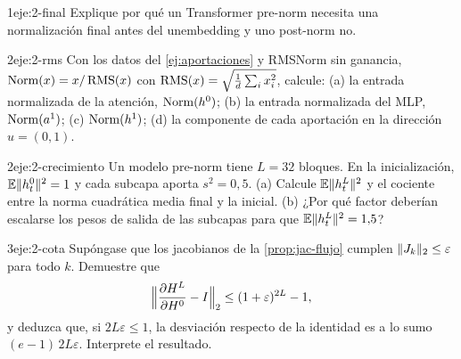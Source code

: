 \begin{ejercicio}{1}{eje:2-final}
Explique por qué un Transformer pre-norm necesita una normalización final antes del unembedding y uno post-norm no.
\end{ejercicio}

\begin{ejercicio}{2}{eje:2-rms}
Con los datos del \cref{ej:aportaciones} y RMSNorm sin ganancia, $\operatorname{Norm}(x)=x/\operatorname{RMS}(x)$ con $\operatorname{RMS}(x)=\sqrt{\frac1d\sum_i x_i^{2}}$, calcule: (a) la entrada normalizada de la atención, $\operatorname{Norm}(h^{0})$; (b) la entrada normalizada del MLP, $\operatorname{Norm}(a^{1})$; (c) $\operatorname{Norm}(h^{1})$; (d) la componente de cada aportación en la dirección $u=(0,1)$.
\end{ejercicio}

\begin{ejercicio}{2}{eje:2-crecimiento}
Un modelo pre-norm tiene $L=32$ bloques. En la inicialización, $\mathbb{E}\lVert h^{0}_t\rVert^{2}=1$ y cada subcapa aporta $s^{2}=0{,}5$. (a) Calcule $\mathbb{E}\lVert h^{L}_t\rVert^{2}$ y el cociente entre la norma cuadrática media final y la inicial. (b) ¿Por qué factor deberían escalarse los pesos de salida de las subcapas para que $\mathbb{E}\lVert h^{L}_t\rVert^{2}=1{,}5$?
\end{ejercicio}

\begin{ejercicio}{3}{eje:2-cota}
Supóngase que los jacobianos de la \cref{prop:jac-flujo} cumplen $\lVert J_k\rVert_2\le\varepsilon$ para todo $k$. Demuestre que
\[
\Bigl\lVert\frac{\partial H^{L}}{\partial H^{0}}-I\Bigr\rVert_2\le(1+\varepsilon)^{2L}-1,
\]
y deduzca que, si $2L\varepsilon\le 1$, la desviación respecto de la identidad es a lo sumo $(e-1)\,2L\varepsilon$. Interprete el resultado.
\end{ejercicio}
